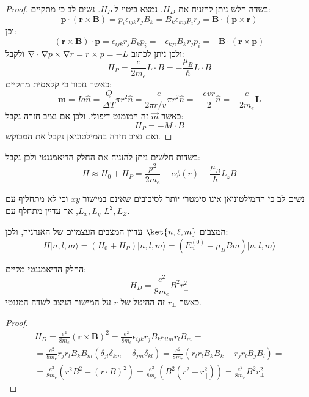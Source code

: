 \documentclass{tstextbook}
\begin{document}
\begin{proof}
בשדה חלש ניתן להזניח את \(H_{D}\). נמצא ביטוי ל-\(H_{P}\). נשים לב כי מתקיים:
$$\mathbf{p}\cdot(\mathbf{r}\times\mathbf{B})=p_{i}\epsilon_{i j k}r_{j}B_{k}=B_{k}\epsilon_{k i j}p_{i}r_{j}=\mathbf{B}\cdot(\mathbf{p}\times\mathbf{r})$$
וכן:
$$(\mathbf{r}\times\mathbf{B})\cdot\mathbf{p}=\epsilon_{i j k}r_{j}B_{k}p_{i}=-\epsilon_{k j i}B_{k}r_{j}p_{i}=-\mathbf{B}\cdot(\mathbf{r}\times\mathbf{p})$$
ולכן ניתן לכתוב \({\bf\nabla}\cdot{\bf\nabla}p\times{\bf\nabla}r=r\times p=-L\) ולקבל:
$$H_{P}=\frac{e}{2m_{e}}L\cdot B=-\frac{\mu_{B}}{\hbar}L \cdot B$$
כאשר נזכור כי קלאסית מתקיים:
$$\mathbf{m}=I a{\hat{n}}={\frac{Q}{\Delta T}}\pi r^{2}{\hat{n}}={\frac{-e}{2\pi r/v}}\pi r^{2}{\hat{n}}=-{\frac{e v r}{2}}{\hat{n}}=-{\frac{e}{2m_{e}}}\mathbf{L}$$
כאשר \(\vec{m}\) זה המומנט דיפולי. ולכן אם נציב חזרה נקבל:
$$H_{P}=-M\cdot B$$
ואם נציב חזרה בהמילטוניאן נקבל את המבוקש.

\end{proof}
\begin{corollary}
בשדות חלשים ניתן להזניח את החלק הדיאמגנטי ולכן נקבל:
$$H\approx H_{0}+H_{P}=\frac{p^{2}}{2m_{e}}-e\phi(r)-\frac{\mu_{B}}{\hbar}L_{z}B$$

\end{corollary}
\begin{remark}
נשים לב כי ההמילטוניאן אינו סימטרי יותר לסיבובים שאינם במישור \(xy\) וכי לא מתחליף עם \(L_{x},L_{y}\), אך עדיין מתחלף עם \(L^{2},L_{Z}\).

\end{remark}
\begin{corollary}
המצבים \(\ket{n,\ell ,m}\) עדיין המצבים העצמיים של האנרגיה, ולכן:
$$H|n,l,m\rangle=\left(H_{0}+H_{P}\right)|n,l,m\rangle=\left(E_{n}^{(0)}-\mu_{B}B m\right)|n,l,m\rangle$$

\end{corollary}
\begin{proposition}
החלק הדיאמגנטי מקיים:
$$H_{D}=\frac{e^{2}}{8m_{e}}B^{2}r_{\perp}^{2}$$
כאשר \(r_{\perp}\) זה ההיטל של \(r\) על המישור הניצב לשדה המגנטי.

\end{proposition}
\begin{proof}
$$\begin{gather}H_{D}=\frac{e^{2}}{8m_{e}}\left(\mathbf{r}\times\mathbf{B}\right)^{2}=\frac{e^{2}}{8m_{e}}\epsilon_{i j k}r_{j}B_{k}\epsilon_{i l m}r_{l}B_{m}=\\=\frac{e^{2}}{8m_{e}}r_{j}r_{l}B_{k}B_{m}\left(\delta_{j l}\delta_{k m}-\delta_{j m}\delta_{k l}\right)=\frac{e^{2}}{8m_{e}}\left(r_{l}r_{l}B_{k}B_{k}-r_{j}r_{l}B_{j}B_{l}\right)=\\=\frac{e^{2}}{8m_{e}}\left(r^{2}B^{2}-\left(r\cdot B\right)^{2}\right)=\frac{e^{2}}{8m_{e}}\left(B^{2}\left(r^{2}-r_{||}^{2}\right)\right)=\frac{e^{2}}{8m_{e}}B^{2}r_{\perp}^{2} 
\end{gather}$$

\end{proof}
\end{document}
